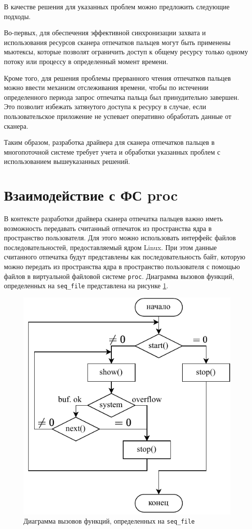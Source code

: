 В качестве решения для указанных проблем можно предложить следующие подходы.

Во-первых, для обеспечения эффективной синхронизации захвата и использования ресурсов сканера отпечатков пальцев могут быть применены мьютексы, которые позволят ограничить доступ к общему ресурсу только одному потоку или процессу в определенный момент времени.

Кроме того, для решения проблемы прерванного чтения отпечатков пальцев можно ввести механизм отслеживания времени, чтобы по истечении определенного периода запрос отпечатка пальца был принудительно завершен. Это позволит избежать затянутого доступа к ресурсу в случае, если пользовательское приложение не успевает оперативно обработать данные от сканера.

Таким образом, разработка драйвера для сканера отпечатков пальцев в многопоточной системе требует учета и обработки указанных проблем с использованием вышеуказанных решений.

\clearpage

\section{Взаимодействие с ФС proc}

В контексте разработки драйвера сканера отпечатка пальцев важно иметь возможность передавать считанный отпечаток из пространства ядра в пространство пользователя. Для этого можно использовать интерфейс файлов последовательностей, предоставляемый ядром Linux. При этом данные считанного отпечатка будут представлены как последовательность байт, которую можно передать из пространства ядра в пространство пользователя с помощью файлов в виртуальной файловой системе \texttt{proc}. Диаграмма вызовов функций, определенных на \texttt{seq\_file} представлена на рисунке \ref{fig:seq-file}.

\begin{figure}[h!]
    \centering
    \includegraphics[width=0.7\linewidth]{img/seq-file.pdf}
    \caption{Диаграмма вызовов функций, определенных на \texttt{seq\_file}}
    \label{fig:seq-file}
\end{figure}

